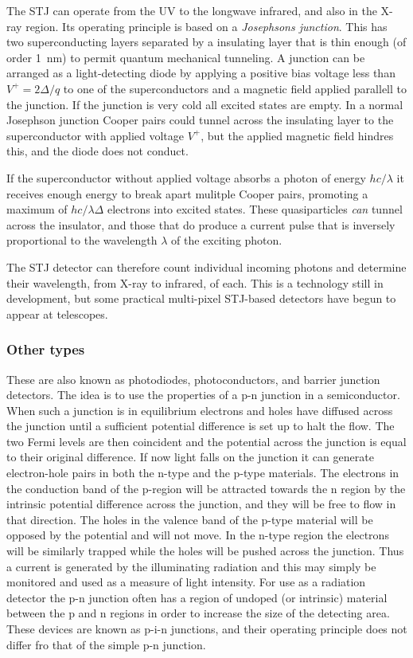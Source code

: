 \documentclass{article}
\begin{document}
The STJ can operate 
from the UV to the longwave infrared, and also in the X-ray region.
Its operating principle is based on a {\it Josephsons junction}. This has two 
superconducting layers separated by a insulating layer that is thin
enough (of order 1~nm) to permit quantum mechanical tunneling. A
junction can be arranged as a light-detecting diode by applying a
positive bias voltage less than $V^{+}=2\Delta/q$ to one of the
superconductors and a magnetic field applied parallell to the
junction. If the junction is very cold all excited states are
empty. In a normal Josephson junction Cooper pairs could tunnel across
the insulating layer to the superconductor with applied voltage
$V^{+}$, but the applied magnetic field hindres this, and the diode
does not conduct.

If the superconductor without applied voltage absorbs a photon of
energy $hc/\lambda$ it receives enough energy to break apart mulitple
Cooper pairs, promoting a maximum of $hc/\lambda\Delta$ electrons into
excited states. These quasiparticles {\it can} tunnel across the
insulator, and those that do produce a current pulse that is inversely
proportional to the wavelength $\lambda$ of the exciting photon.

The STJ detector can therefore count individual incoming photons and
determine their wavelength, from X-ray to infrared, of each. This is a
technology still in development, but some practical multi-pixel
STJ-based detectors have begun to appear at telescopes.

\subsubsection*{Other types}

 These are also known as photodiodes,
photoconductors, and barrier junction detectors. The idea is to use the
properties of a p-n junction in a semiconductor. When such a junction
is in equilibrium electrons and holes have diffused across the
junction until a sufficient potential difference is set up to halt the
flow. The two Fermi levels are then coincident and the potential
across the junction is equal to their original difference. If now
light falls on the junction it can generate electron-hole pairs in
both the n-type and the p-type materials. The electrons in the
conduction band of the p-region will be attracted towards the n region
by the intrinsic potential difference across the junction, and they
will be free to flow in that direction. The holes in the valence band
of the p-type material will be opposed by the potential and will not
move. In the n-type region the electrons will be similarly trapped
while the holes will be pushed across the junction. Thus a current is
generated by the illuminating radiation and this may simply be
monitored and used as a measure of light intensity. For use as a
radiation detector the p-n junction often has a region of undoped (or
intrinsic) material between the p and n regions in order to increase
the size of the detecting area. These devices are known as p-i-n
junctions, and their operating principle does not differ fro that of
the simple p-n junction.
\end{document}
